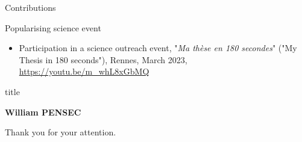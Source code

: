 \begin{frame}[allowframebreaks]{Contributions}
    \begin{block}{Popularising science event}
        \begin{itemize}
            \item {\small Participation in a science outreach event, "\textit{Ma thèse en 180 secondes}" ("My Thesis in 180 seconds"), Rennes, March 2023, \url{https://youtu.be/m_whL8xGbMQ}}
        \end{itemize}
    \end{block}
\end{frame}
\begin{frame}
    \centering

    \vfill
    \begin{beamercolorbox}[sep=8pt,center,shadow=true,rounded=true]{title}
        \NoHyper\large\inserttitle\par\endNoHyper
        \vspace{.5cm}
        \NoHyper\large\insertsubtitle\par\endNoHyper
    \end{beamercolorbox}
    \vfill

    \large \textbf{William PENSEC}

    \Large Thank you for your attention.

    \vfill


\end{frame}
